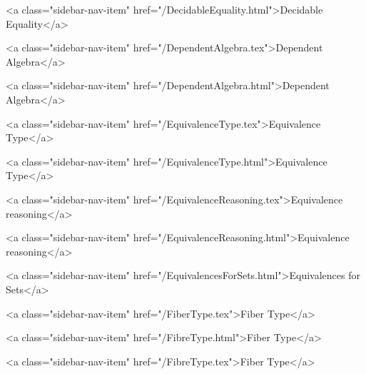       
        
          <a class="sidebar-nav-item" href="/DecidableEquality.html">Decidable Equality</a>
        
      
    
      
        
          <a class="sidebar-nav-item" href="/DependentAlgebra.tex">Dependent Algebra</a>
        
      
    
      
        
          <a class="sidebar-nav-item" href="/DependentAlgebra.html">Dependent Algebra</a>
        
      
    
      
        
          <a class="sidebar-nav-item" href="/EquivalenceType.tex">Equivalence Type</a>
        
      
    
      
        
          <a class="sidebar-nav-item" href="/EquivalenceType.html">Equivalence Type</a>
        
      
    
      
        
          <a class="sidebar-nav-item" href="/EquivalenceReasoning.tex">Equivalence reasoning</a>
        
      
    
      
        
          <a class="sidebar-nav-item" href="/EquivalenceReasoning.html">Equivalence reasoning</a>
        
      
    
      
        
          <a class="sidebar-nav-item" href="/EquivalencesForSets.html">Equivalences for Sets</a>
        
      
    
      
        
          <a class="sidebar-nav-item" href="/FiberType.tex">Fiber Type</a>
        
      
    
      
        
          <a class="sidebar-nav-item" href="/FibreType.html">Fiber Type</a>
        
      
    
      
        
          <a class="sidebar-nav-item" href="/FibreType.tex">Fiber Type</a>
        
